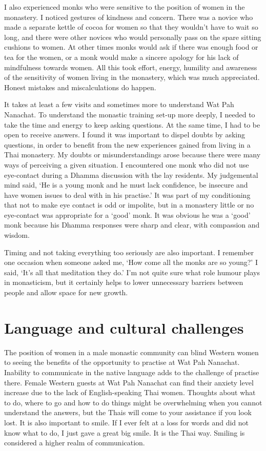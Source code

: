 I also experienced monks who were sensitive to the position of women in
the monastery. I noticed gestures of kindness and concern. There was a
novice who made a separate kettle of cocoa for women so that they
wouldn't have to wait so long, and there were other novices who would
personally pass on the spare sitting cushions to women. At other times
monks would ask if there was enough food or tea for the women, or a monk
would make a sincere apology for his lack of mindfulness towards women. 
All this took effort, energy, humility and awareness of the sensitivity
of women living in the monastery, which was much appreciated. Honest
mistakes and miscalculations do happen. 

It takes at least a few visits and sometimes more to understand Wat Pah
Nanachat. To understand the monastic training set-up more deeply, I
needed to take the time and energy to keep asking questions. At the same
time, I had to be open to receive answers. I found it was important to
dispel doubts by asking questions, in order to benefit from the new
experiences gained from living in a Thai monastery. My doubts or
misunderstandings arose because there were many ways of perceiving a
given situation. I encountered one monk who did not use eye-contact
during a Dhamma discussion with the lay residents. My judgemental mind
said, `He is a young monk and he must lack confidence, be insecure and
have women issues to deal with in his practise.' It was part of my
conditioning that not to make eye contact is odd or impolite, but in a
monastery little or no eye-contact was appropriate for a `good' monk. It
was obvious he was a `good' monk because his Dhamma responses were sharp
and clear, with compassion and wisdom. 

Timing and not taking everything too seriously are also important. I
remember one occasion when someone asked me, `How come all the monks are
so young?' I said, `It's all that meditation they do.' I'm not quite
sure what role humour plays in monasticism, but it certainly helps to
lower unnecessary barriers between people and allow space for new
growth. 

\section{Language and cultural challenges}

The position of women in a male monastic community can blind Western
women to seeing the benefits of the opportunity to practise at Wat Pah
Nanachat. Inability to communicate in the native language adds to the
challenge of practise there. Female Western guests at Wat Pah Nanachat
can find their anxiety level increase due to the lack of
English-speaking Thai women. Thoughts about what to do, where to go and
how to do things might be overwhelming when you cannot understand the
answers, but the Thais will come to your assistance if you look lost. It
is also important to smile. If I ever felt at a loss for words and did
not know what to do, I just gave a great big smile. It is the Thai way. 
Smiling is considered a higher realm of communication. 

